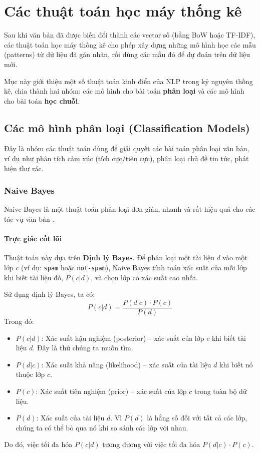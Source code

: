 
\section{Các thuật toán học máy thống kê}
\label{sec:statistical_ml_algos}

Sau khi văn bản đã được biến đổi thành các vector số (bằng BoW hoặc TF-IDF), các thuật toán học máy thống kê cho phép xây dựng những mô hình học các mẫu (patterns) từ dữ liệu đã gán nhãn, rồi dùng các mẫu đó để dự đoán trên dữ liệu mới.

Mục này giới thiệu một số thuật toán kinh điển của NLP trong kỷ nguyên thống kê, chia thành hai nhóm: các mô hình cho bài toán \textbf{phân loại} và các mô hình cho bài toán \textbf{học chuỗi}.

\subsection{Các mô hình phân loại (Classification Models)}
\label{ssec:classification_models}
Đây là nhóm các thuật toán dùng để giải quyết các bài toán phân loại văn bản, ví dụ như phân tích cảm xúc (tích cực/tiêu cực), phân loại chủ đề tin tức, phát hiện thư rác.

\subsubsection{Naive Bayes}
Naive Bayes là một thuật toán phân loại đơn giản, nhanh và rất hiệu quả cho các tác vụ văn bản \cite{manning2008introduction}.

\paragraph{Trực giác cốt lõi}
Thuật toán này dựa trên \textbf{Định lý Bayes}. Để phân loại một tài liệu $d$ vào một lớp $c$ (ví dụ: \texttt{spam} hoặc \texttt{not-spam}), Naive Bayes tính toán xác suất của mỗi lớp khi biết tài liệu đó, $P(c|d)$, và chọn lớp có xác suất cao nhất.

Sử dụng định lý Bayes, ta có:
$$ P(c|d) = \frac{P(d|c) \cdot P(c)}{P(d)} $$
Trong đó:
\begin{itemize}
    \item $P(c|d)$: Xác suất hậu nghiệm (posterior) -- xác suất của lớp $c$ khi biết tài liệu $d$. Đây là thứ chúng ta muốn tìm.
    \item $P(d|c)$: Xác suất khả năng (likelihood) -- xác suất của tài liệu $d$ khi biết nó thuộc lớp $c$.
    \item $P(c)$: Xác suất tiên nghiệm (prior) -- xác suất của lớp $c$ trong toàn bộ dữ liệu.
    \item $P(d)$: Xác suất của tài liệu $d$. Vì $P(d)$ là hằng số đối với tất cả các lớp, chúng ta có thể bỏ qua nó khi so sánh các lớp với nhau.
\end{itemize}
Do đó, việc tối đa hóa $P(c|d)$ tương đương với việc tối đa hóa $P(d|c) \cdot P(c)$.


